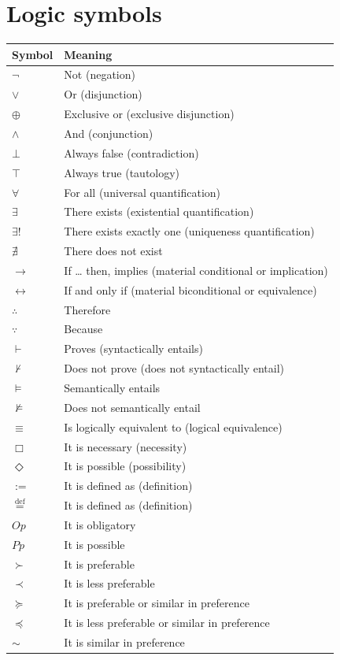 \documentclass[11pt]{article}
\newcommand{\defequal}{\stackrel{\scriptscriptstyle\mathrm{def}}{=}}
\begin{document}
\section{Logic symbols}
\label{sec:org3093d01}
\begin{center}
\begin{tabular}{l|l}
Symbol & Meaning\\
\hline
\(\neg\) & Not (negation)\\
\(\vee\) & Or (disjunction)\\
\(\oplus\) & Exclusive or (exclusive disjunction)\\
\(\wedge\) & And (conjunction)\\
\(\bot\) & Always false (contradiction)\\
\(\top\) & Always true (tautology)\\
\(\forall\) & For all (universal quantification)\\
\(\exists\) & There exists (existential quantification)\\
\(\exists !\) & There exists exactly one (uniqueness quantification)\\
\(\nexists\) & There does not exist\\
\(\rightarrow\) & If \ldots{} then, implies (material conditional or implication)\\
\(\leftrightarrow\) & If and only if (material biconditional or equivalence)\\
\(\therefore\) & Therefore\\
\(\because\) & Because\\
\(\vdash\) & Proves (syntactically entails)\\
\(\nvdash\) & Does not prove (does not syntactically entail)\\
\(\vDash\) & Semantically entails\\
\(\nvDash\) & Does not semantically entail\\
\(\equiv\) & Is logically equivalent to (logical equivalence)\\
\(\Box\) & It is necessary (necessity)\\
\(\Diamond\) & It is possible (possibility)\\
\(:=\) & It is defined as (definition)\\
\(\defequal\) & It is defined as (definition)\\
\(Op\) & It is obligatory\\
\(Pp\) & It is possible\\
\(\succ\) & It is preferable\\
\(\prec\) & It is less preferable\\
\(\succeq\) & It is preferable or similar in preference\\
\(\preceq\) & It is less preferable or similar in preference\\
\(\sim\) & It is similar in preference\\
\end{tabular}
\end{center}
\end{document}
